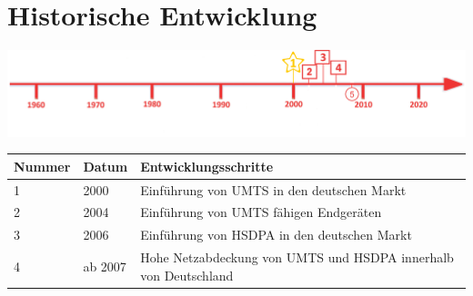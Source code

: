 \section*{Historische Entwicklung}
\includegraphics[width=\textwidth]{Kapitel/3G/Grafiken/Zeitstrahl}
\par
\noindent
\begin{tabular}{|p{1 cm}|p{3 cm}|p{13.55 cm}|}
	\hline
	Nummer & Datum & Entwicklungsschritte ~\cite{3G.2}\\
	\hline
	1 & 2000 & Einführung von UMTS in den deutschen Markt\\
	\hline
	2 & 2004 & Einführung von UMTS fähigen Endgeräten\\
	\hline
	3 & 2006 & Einführung von HSDPA in den deutschen Markt\\
	\hline
	4 & ab 2007 & Hohe Netzabdeckung von UMTS und HSDPA innerhalb von Deutschland \\
	\hline
\end{tabular}
\par

